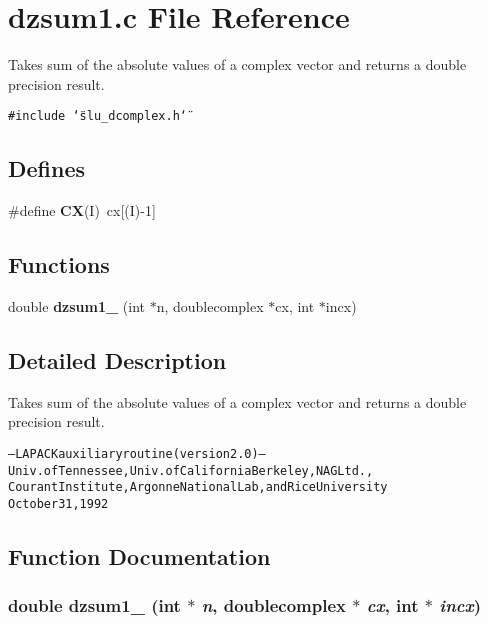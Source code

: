 \section{dzsum1.c File Reference}
\label{dzsum1_8c}
Takes sum of the absolute values of a complex vector and returns a double precision result. 

{\tt \#include \char`\"{}slu\_\-dcomplex.h\char`\"{}}\par
\subsection*{Defines}
\begin{CompactItemize}
\item 
\#define {\bf CX}(I)~cx[(I)-1]\label{dzsum1_8c_5a76da95c549c41790389a76e12fdcb5}

\end{CompactItemize}
\subsection*{Functions}
\begin{CompactItemize}
\item 
double {\bf dzsum1\_\-} (int $\ast$n, doublecomplex $\ast$cx, int $\ast$incx)
\end{CompactItemize}


\subsection{Detailed Description}
Takes sum of the absolute values of a complex vector and returns a double precision result. 

\small\begin{alltt}
     -- LAPACK auxiliary routine (version 2.0) --   
     Univ. of Tennessee, Univ. of California Berkeley, NAG Ltd.,   
     Courant Institute, Argonne National Lab, and Rice University   
     October 31, 1992   
 \end{alltt}\normalsize 
 

\subsection{Function Documentation}
\subsubsection{\setlength{\rightskip}{0pt plus 5cm}double dzsum1\_\- (int $\ast$ {\em n}, doublecomplex $\ast$ {\em cx}, int $\ast$ {\em incx})}\label{dzsum1_8c_3fade9d45be0f00827565d6d0f37fe5d}


